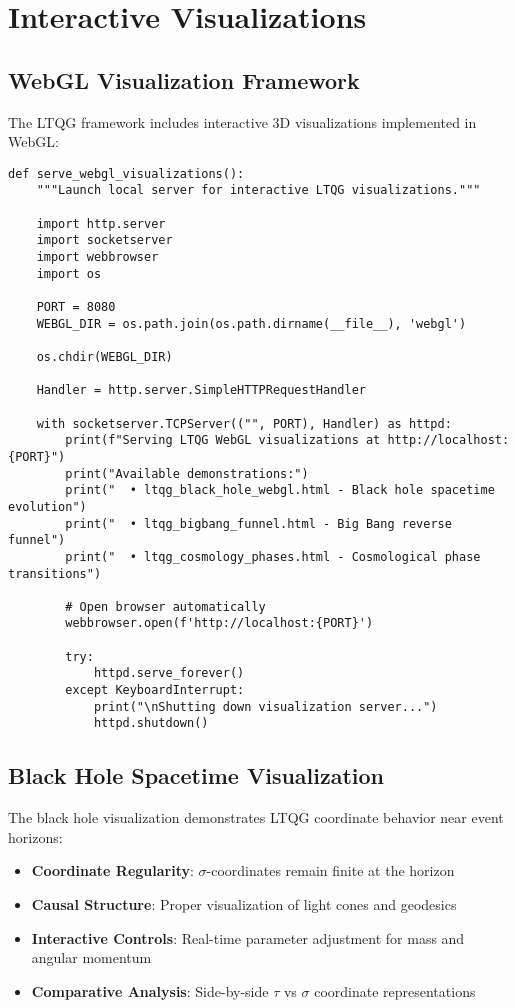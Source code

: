 \documentclass[11pt,a4paper]{article}
\theoremstyle{definition}
\theoremstyle{remark}
\begin{document}
\section{Interactive Visualizations}

\subsection{WebGL Visualization Framework}

The LTQG framework includes interactive 3D visualizations implemented in WebGL:

\begin{lstlisting}
def serve_webgl_visualizations():
    """Launch local server for interactive LTQG visualizations."""
    
    import http.server
    import socketserver
    import webbrowser
    import os
    
    PORT = 8080
    WEBGL_DIR = os.path.join(os.path.dirname(__file__), 'webgl')
    
    os.chdir(WEBGL_DIR)
    
    Handler = http.server.SimpleHTTPRequestHandler
    
    with socketserver.TCPServer(("", PORT), Handler) as httpd:
        print(f"Serving LTQG WebGL visualizations at http://localhost:{PORT}")
        print("Available demonstrations:")
        print("  • ltqg_black_hole_webgl.html - Black hole spacetime evolution")
        print("  • ltqg_bigbang_funnel.html - Big Bang reverse funnel")
        print("  • ltqg_cosmology_phases.html - Cosmological phase transitions")
        
        # Open browser automatically
        webbrowser.open(f'http://localhost:{PORT}')
        
        try:
            httpd.serve_forever()
        except KeyboardInterrupt:
            print("\nShutting down visualization server...")
            httpd.shutdown()
\end{lstlisting}

\subsection{Black Hole Spacetime Visualization}

The black hole visualization demonstrates LTQG coordinate behavior near event horizons:

\begin{itemize}
\item \textbf{Coordinate Regularity}: $\sigma$-coordinates remain finite at the horizon
\item \textbf{Causal Structure}: Proper visualization of light cones and geodesics
\item \textbf{Interactive Controls}: Real-time parameter adjustment for mass and angular momentum
\item \textbf{Comparative Analysis}: Side-by-side $\tau$ vs $\sigma$ coordinate representations
\end{itemize}
\end{document}
